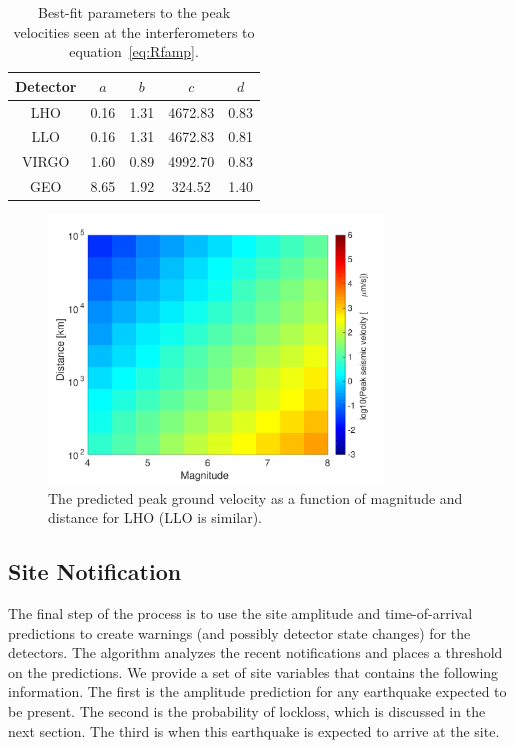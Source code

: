\documentclass[twocolumn, prl, superscriptaddress]{revtex4}
\begin{document}
\begin{table}[]
\centering
\begin{tabular}{|c|c|c|c|c|}
\hline
Detector & $a$ & $b$ & $c$ & $d$ \\ \hline
LHO & 0.16 & 1.31 & 4672.83 & 0.83 \\ \hline
LLO & 0.16 & 1.31 & 4672.83 & 0.81 \\ \hline
VIRGO & 1.60 & 0.89 & 4992.70 & 0.83 \\ \hline
GEO & 8.65 & 1.92 & 324.52 & 1.40 \\ \hline
\end{tabular}
\caption{Best-fit parameters to the peak velocities seen at the interferometers to equation~\ref{eq:Rfamp}.}
\label{table:fit}
\end{table}

\begin{figure}[t]
\hspace*{-0.5cm}
 \includegraphics[width=3.5in]{LHO_M_r.pdf}
 \caption{The predicted peak ground velocity as a function of magnitude and distance for LHO (LLO is similar).}
 \label{fig:MvsR}
\end{figure}

\subsection{Site Notification}
The final step of the process is to use the site amplitude and time-of-arrival predictions to create warnings (and possibly detector state changes) for the detectors. The algorithm analyzes the recent notifications and places a threshold on the predictions. We provide a set of site variables that contains the following information. The first is the amplitude prediction for any earthquake expected to be present.
The second is the probability of lockloss, which is discussed in the next section. The third is when this earthquake is expected to arrive at the site.
		
\end{document}
